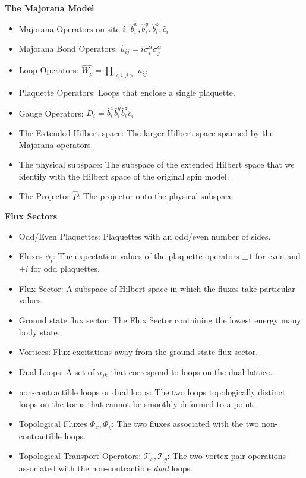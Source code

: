 \textbf{The Majorana Model}

\begin{itemize}
\tightlist
\item
  Majorana Operators on site \(i\): \(\hat{b}^x_i, \hat{b}^y_i, \hat{b}^z_i, \hat{c}_i\)
\item
  Majorana Bond Operators: \(\hat{u}_{ij} = i \sigma_i^\alpha \sigma_j^\alpha\)
\item
  Loop Operators: \(\hat{W_p} = \prod_{<i,j>} u_{ij}\)
\item
  Plaquette Operators: Loops that enclose a single plaquette.
\item
  Gauge Operators: \(D_i = \hat{b}^x_i \hat{b}^y_i \hat{b}^z_i \hat{c}_i\)
\item
  The Extended Hilbert space: The larger Hilbert space spanned by the Majorana operators.
\item
  The physical subspace: The subspace of the extended Hilbert space that we identify with the Hilbert space of the original spin model.
\item
  The Projector \(\hat{P}\): The projector onto the physical subspace.
\end{itemize}

\textbf{Flux Sectors}

\begin{itemize}
\item
  Odd/Even Plaquettes: Plaquettes with an odd/even number of sides.
\item
  Fluxes \(\phi_i\): The expectation values of the plaquette operators \(\pm 1\) for even and \(\pm i\) for odd plaquettes.
\item
  Flux Sector: A subspace of Hilbert space in which the fluxes take particular values.
\item
  Ground state flux sector: The Flux Sector containing the lowest energy many body state.
\item
  Vortices: Flux excitations away from the ground state flux sector.
\item
  Dual Loops: A set of \(u_{jk}\) that correspond to loops on the dual lattice.
\item
  non-contractible loops or dual loops: The two loops topologically distinct loops on the torus that cannot be smoothly deformed to a point.
\item
  Topological Fluxes \(\Phi_{x}, \Phi_{y}\): The two fluxes associated with the two non-contractible loops.
\item
  Topological Transport Operators: \(\mathcal{T}_{x}, \mathcal{T}_{y}\): The two vortex-pair operations associated with the non-contractible \emph{dual} loops.
\end{itemize}

